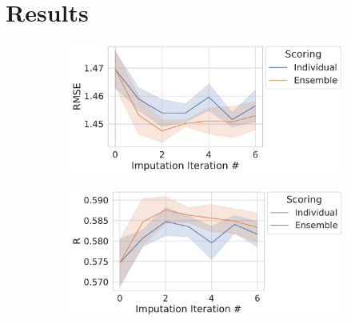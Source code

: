 \documentclass[journal=jmcmar,manuscript=article]{achemso}
\begin{document}

\section{Results}

\begin{figure}[tbph]
    \centering
    \begin{subfigure}[t]{0.48\textwidth}
        \centering
        \includegraphics[width=\linewidth]{figures/InitialImpRMSE.pdf}
    \end{subfigure}
    \hfill
    \begin{subfigure}[t]{0.48\textwidth}
        \centering
        \includegraphics[width=\linewidth]{figures/InitialImpR.pdf}
    \end{subfigure}


\end{figure}
\end{document}
